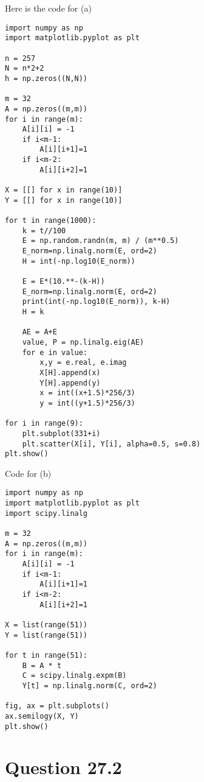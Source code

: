 \documentclass[letterpaper,11pt\iffalse ,draft\fi]{article}
\begin{document}
Here is the code for (a)

\begin{lstlisting}
import numpy as np
import matplotlib.pyplot as plt

n = 257
N = n*2+2
h = np.zeros((N,N))

m = 32
A = np.zeros((m,m))
for i in range(m):
    A[i][i] = -1
    if i<m-1:
        A[i][i+1]=1
    if i<m-2:
        A[i][i+2]=1

X = [[] for x in range(10)]
Y = [[] for x in range(10)]

for t in range(1000):
    k = t//100
    E = np.random.randn(m, m) / (m**0.5)
    E_norm=np.linalg.norm(E, ord=2)
    H = int(-np.log10(E_norm))

    E = E*(10.**-(k-H))
    E_norm=np.linalg.norm(E, ord=2)
    print(int(-np.log10(E_norm)), k-H)
    H = k

    AE = A+E
    value, P = np.linalg.eig(AE)
    for e in value:
        x,y = e.real, e.imag
        X[H].append(x)
        Y[H].append(y)
        x = int((x+1.5)*256/3)
        y = int((y+1.5)*256/3)

for i in range(9):
    plt.subplot(331+i)
    plt.scatter(X[i], Y[i], alpha=0.5, s=0.8)
plt.show()
\end{lstlisting}

Code for (b)

\begin{lstlisting}
import numpy as np
import matplotlib.pyplot as plt
import scipy.linalg

m = 32
A = np.zeros((m,m))
for i in range(m):
    A[i][i] = -1
    if i<m-1:
        A[i][i+1]=1
    if i<m-2:
        A[i][i+2]=1

X = list(range(51))
Y = list(range(51))

for t in range(51):
    B = A * t
    C = scipy.linalg.expm(B)
    Y[t] = np.linalg.norm(C, ord=2)

fig, ax = plt.subplots() 
ax.semilogy(X, Y)
plt.show()
\end{lstlisting}

\newpage

\section*{Question 27.2}
\end{document}
